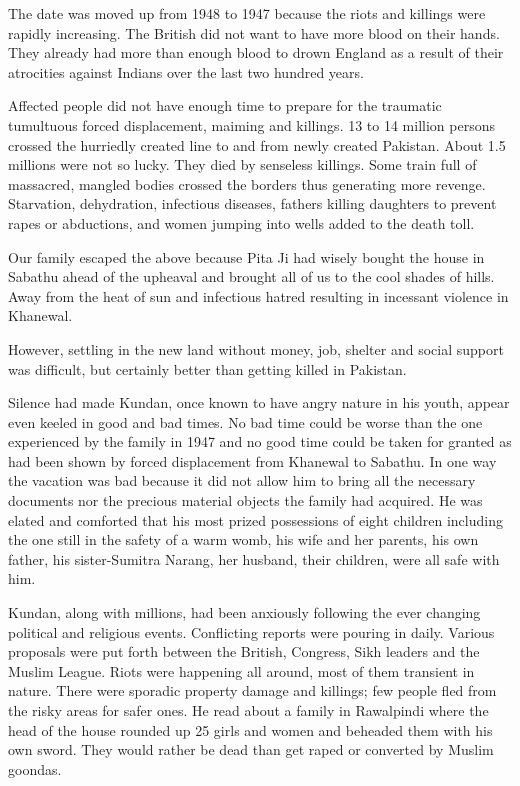 The date was moved up from 1948 to 1947 because the riots and killings were rapidly increasing. The British did not want to have more blood on their hands. They already had more than enough blood to drown England as a result of their atrocities against Indians over the last two hundred years. 

Affected people did not have enough time to prepare for the traumatic tumultuous forced displacement, maiming and killings. 13 to 14 million persons crossed the hurriedly created line to and from newly created Pakistan. About 1.5 millions were not so lucky. They died by senseless killings. Some train full of massacred, mangled bodies crossed the borders thus generating more revenge. Starvation, dehydration, infectious diseases, fathers killing daughters to prevent rapes or abductions, and women jumping into wells added to the death toll. 

Our family escaped the above because Pita Ji had wisely bought the house in Sabathu ahead of the upheaval and brought all of us to the cool shades of hills. Away from the heat of sun and infectious hatred resulting in incessant violence in Khanewal. 

However, settling in the new land without money, job, shelter and social support was difficult, but certainly better than getting killed in Pakistan. 

Silence had made Kundan, once known to have angry nature in his youth, appear even keeled in good and bad times. No bad time could be worse than the one experienced by the family in 1947 and no good time could be taken for granted as had been shown by forced displacement from Khanewal to Sabathu. In one way the vacation was bad because it did not allow him to bring all the necessary documents nor the precious material objects the family had acquired. He was elated and comforted that his most prized possessions of eight children including the one still in the safety of a warm womb, his wife and her parents, his own father, his sister-Sumitra Narang, her husband, their children, were all safe with him. 

Kundan, along with millions, had been anxiously following the ever changing political and religious events. Conflicting reports were pouring in daily. Various proposals were put forth between the British, Congress, Sikh leaders  and the Muslim League. Riots were happening all around, most of them transient in nature. There were sporadic property damage and killings; few people fled from the risky areas for safer ones. He read about a family in Rawalpindi where the head of the house rounded up 25 girls and women and beheaded them with his own sword. They would rather be dead than get raped or converted by Muslim goondas. 

